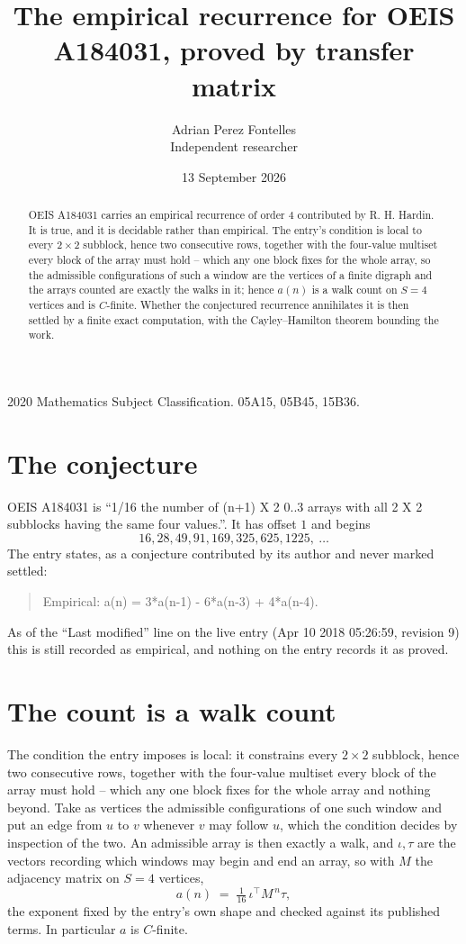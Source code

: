 \documentclass[11pt,a4paper]{article}
\title{The empirical recurrence for OEIS A184031, proved by transfer matrix}
\author{Adrian Perez Fontelles\\ \small Independent researcher}
\date{13 September 2026}
\theoremstyle{plain}
\theoremstyle{definition}
\begin{document}
\maketitle

\begin{abstract}
OEIS A184031 carries an empirical recurrence of order $4$ contributed by R. H. Hardin. It is
true, and it is decidable rather than empirical. The entry's condition is local to every $2\times2$ subblock, hence two consecutive rows, together with the four-value multiset every block of the array must hold -- which any one block fixes for the whole array, so
the admissible configurations of such a window are the vertices of a finite digraph and the
arrays counted are exactly the walks in it; hence $a(n)$ is a walk count on $S=4$ vertices
and is $C$-finite. Whether the conjectured recurrence annihilates it is then settled by a
finite exact computation, with the Cayley--Hamilton theorem bounding the work.
\end{abstract}

\noindent\small 2020 Mathematics Subject Classification. 05A15, 05B45, 15B36.\normalsize

\section{The conjecture}

OEIS A184031 is ``1/16 the number of (n+1) X 2 0..3 arrays with all 2 X 2 subblocks having the same four values.''. It has offset $1$ and begins
\[
16, 28, 49, 91, 169, 325, 625, 1225,\ \dots
\]
The entry states, as a conjecture contributed by its author and never marked settled:
\begin{quote}
Empirical: a(n) = 3*a(n-1) - 6*a(n-3) + 4*a(n-4).
\end{quote}
As of the ``Last modified'' line on the live entry (Apr 10 2018 05:26:59, revision 9) this is still
recorded as empirical, and nothing on the entry records it as proved.

\section{The count is a walk count}

The condition the entry imposes is local: it constrains every $2\times2$ subblock, hence two consecutive rows, together with the four-value multiset every block of the array must hold -- which any one block fixes for the whole array and nothing beyond. Take as vertices the admissible configurations of one such window and put an edge from $u$ to $v$ whenever $v$ may follow $u$, which the condition decides by inspection of the two.
An admissible array is then exactly a walk, and $\iota,\tau$ are the vectors recording which windows may begin and end an array, so with $M$ the adjacency matrix on $S=4$ vertices,
\[
a(n)\;=\;\tfrac{1}{16}\,\iota^{\!\top}M^{\,n}\tau ,
\]
the exponent fixed by the entry's own shape and checked against its published terms. In
particular $a$ is $C$-finite.
\end{document}

